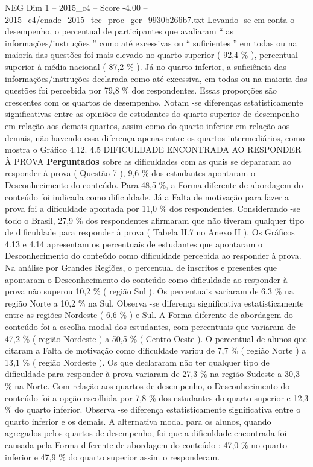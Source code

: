 \begin{textsample}{NEG Dim 1 – 2015\_c4 – Score -4.00 – 2015\_c4/enade\_2015\_tec\_proc\_ger\_9930b266b7.txt}
Levando -se em conta o desempenho, o percentual de participantes que avaliaram “ as informações/instruções ” como até excessivas ou “ suficientes ” em todas ou na maioria das questões foi mais elevado no quarto superior ( 92,4 \% ), percentual superior à média nacional ( 87,2 \% ).
Já no quarto inferior, a suficiência das informações/instruções declarada como até excessiva, em todas ou na maioria das questões foi percebida por 79,8 \% dos respondentes.
Essas proporções são crescentes com os quartos de desempenho.
Notam -se diferenças estatisticamente significativas entre as opiniões de estudantes do quarto superior de desempenho em relação aos demais quartos, assim como do quarto inferior em relação aos demais, não havendo essa diferença apenas entre os quartos intermediários, como mostra o Gráfico 4.12. 4.5 DIFICULDADE ENCONTRADA AO RESPONDER À PROVA \textbf{Perguntados} sobre as dificuldades com as quais se depararam ao responder à prova ( Questão 7 ), 9,6 \% dos estudantes apontaram o Desconhecimento do conteúdo.
Para 48,5 \%, a Forma diferente de abordagem do conteúdo foi indicada como dificuldade.
Já a Falta de motivação para fazer a prova foi a dificuldade apontada por 11,0 \% dos respondentes.
Considerando -se todo o Brasil, 27,9 \% dos respondentes afirmaram que não tiveram qualquer tipo de dificuldade para responder à prova ( Tabela II.7 no Anexo II ).
Os Gráficos 4.13 e 4.14 apresentam os percentuais de estudantes que apontaram o Desconhecimento do conteúdo como dificuldade percebida ao responder à prova.
Na análise por Grandes Regiões, o percentual de inscritos e presentes que apontaram o Desconhecimento do conteúdo como dificuldade ao responder à prova não superou 10,2 \% ( região Sul ).
Os percentuais variaram de 6,3 \% na região Norte a 10,2 \% na Sul.
Observa -se diferença significativa estatisticamente entre as regiões Nordeste ( 6,6 \% ) e Sul.
A Forma diferente de abordagem do conteúdo foi a escolha modal dos estudantes, com percentuais que variaram de 47,2 \% ( região Nordeste ) a 50,5 \% ( Centro-Oeste ).
O percentual de alunos que citaram a Falta de motivação como dificuldade variou de 7,7 \% ( região Norte ) a 13,1 \% ( região Nordeste ).
Os que declararam não ter qualquer tipo de dificuldade para responder à prova variaram de 27,3 \% na região Sudeste a 30,3 \% na Norte.
Com relação aos quartos de desempenho, o Desconhecimento do conteúdo foi a opção escolhida por 7,8 \% dos estudantes do quarto superior e 12,3 \% do quarto inferior.
Observa -se diferença estatisticamente significativa entre o quarto inferior e os demais.
A alternativa modal para os alunos, quando agregados pelos quartos de desempenho, foi que a dificuldade encontrada foi causada pela Forma diferente de abordagem do conteúdo : 47,0 \% no quarto inferior e 47,9 \% do quarto superior assim o responderam.

\end{textsample}
